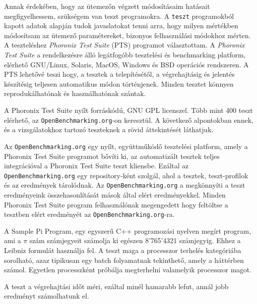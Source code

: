 

Annak érdekében, hogy az ütemezőn végzett módosításaim hatásait megfigyelhessem, szükségem van teszt programokra. A \texttt{teszt} programokból kapott adatok alapján tudok javaslatokat tenni arra, hogy milyen mértékben módosítsam az ütemező paramétereket, bizonyos felhasználási módokhoz mérten.
A teszteléshez \textit{Phoronix Test Suite} (PTS) programot választottam.
A \textit{Phoronix Test Suite} a rendelkezésre álló legátfogóbb tesztelési és benchmarking platform, elérhető GNU/Linux, Solaris, MacOS, Windows és BSD operációs rendszeren.
A PTS lehetővé teszi hogy, a tesztek a telepítésétől, a végrehajtásig és jelentés készítésig teljesen automatikus módon történjenek.
Minden tesztet könnyen reprodukálhatónak és használhatónak szántak.

A Phoronix Test Suite nyílt forráskódú, GNU GPL licenszel.
Több mint 400 teszt elérhető, az \texttt{OpenBenchmarking.org}-on keresztül.
A következő alpontokban ennek, és a vizsgálatokhoz tartozó teszteknek a rövid áttekintését láthatjuk.


Az \texttt{OpenBenchmarking.org} egy nyílt, együttműködő tesztelési platform, amely a Phoronix Test Suite programot bővíti ki, az automatizált tesztek teljes integrációval a Phoronix Test Suite teszt kliensbe.
Ezáltal az \texttt{OpenBenchmarking.org} egy repository-ként szolgál, ahol a tesztek, teszt-profilok és az eredmények tárolódnak.
Az \texttt{OpenBenchmarking.org} a megkönnyíti a teszt eredményeink összehasonlítását mások által elért eredményekkel.
Minden Phoronix Test Suite program felhasználónak megengedett hogy feltöltse a tesztben elért eredményét az \texttt{OpenBenchmarking.org}-ra.


A  Sample Pi Program, egy egyszerű C++ programozási nyelven megírt program, ami a $\pi$ szám számjegyeit számolja ki egészen 8'765'4321 számjegyig. Ehhez a Leibniz formulát használja fel. A teszt maga a processzor terhelés kategóriába sorolható, azaz tipikusan egy batch folyamatnak tekinthető, amely a háttérben számol. Egyetlen processzként próbálja megterhelni valamelyik processzor magot. 

A teszt a végrehajtási időt méri, ezáltal minél hamarabb lefut, annál jobb eredményt számolhatunk el.

